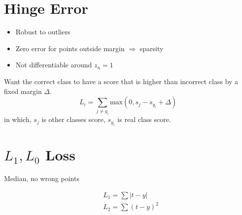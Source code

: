 \section{Hinge Error}
\begin{itemize}
	\item Robust to outliers
	\item Zero error for points outside margin $\Rightarrow$ sparsity
	\item Not differentiable around $z_n = 1$
\end{itemize}
\note Want the correct class to have a score that is higher than incorrect class by a fixed margin $\Delta$.
\begin{equation}
	L_i = \sum_{j \neq y_i} \text{max}(0, s_j - s_{y_i} + \Delta)
\end{equation}
in which, $s_j$ is other classes score, $s_{y_i}$ is real class score.

\section{$L_1, L_0$ Loss}
Median, no wrong points

\begin{align}
	&L_1 = \sum |t-y| \\
	&L_2 = \sum (t-y)^2
\end{align}